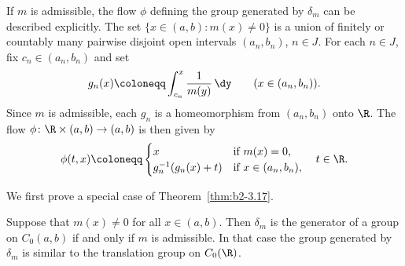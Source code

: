 \begin{remark}\label{rem:b2-3.17}
If\/ $m$ is admissible, the flow $\phi$ defining the group generated by $\delta_{m}$
can be described explicitly.
The set $\{x \in (a,b) : m(x) \neq 0\}$ is a union of finitely or countably many
pairwise disjoint open intervals $(a_{n},b_{n})$, $n \in J$.
For each $n \in J$, fix $c_{n} \in (a_{n},b_{n})$ and set
\[
    g_{n}(x) \coloneqq \int_{c_{n}}^{x} \frac{1}{m(y)}\,\dy \qquad (x \in (a_{n},b_{n})).
\]
Since $m$ is admissible, each $g_{n}$ is a homeomorphism from $(a_{n},b_{n})$ onto $\R$.
The flow $\phi \colon \R \times (a,b) \to (a,b)$ is then given by
\begin{equation}\label{eq:b2-3.22}
    \phi(t,x) \coloneqq \begin{cases}
        x                       & \text{if } m(x) = 0, \\
        g_{n}^{-1}(g_{n}(x)+t) & \text{if } x \in (a_{n},b_{n}),
    \end{cases}
    \quad t \in \R.
\end{equation}
\end{remark}
We first prove a special case of Theorem~\ref{thm:b2-3.17}.
\begin{proposition}\label{prop:b2-3.18}
%
Suppose that $m(x) \neq 0$ for all $x \in (a,b)$.
Then $\delta_{m}$ is the generator of a group on $C_{0}(a,b)$ if and only if\/ $m$ is admissible.
In that case the group generated by $\delta_{m}$ is similar to the translation group on $C_{0}(\R)$.
\end{proposition}

